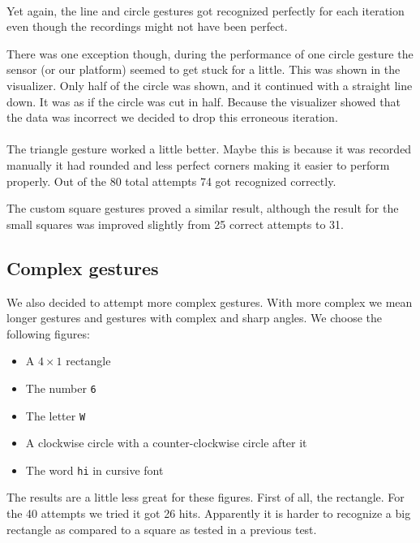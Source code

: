 \documentclass[a4paper]{article}
\providecommand{\tightlist}{%
\setlength{\itemsep}{0pt}\setlength{\parskip}{0pt}}
\begin{document}
  \paragraph{}
  Yet again, the line and circle gestures got recognized perfectly for each
  iteration even though the recordings might not have been perfect.

  There was one exception though, during the performance of one circle gesture
  the sensor (or our platform) seemed to get stuck for a little. This was shown
  in the visualizer. Only half of the circle was shown, and it continued with a
  straight line down. It was as if the circle was cut in half. Because the
  visualizer showed that the data was incorrect we decided to drop this erroneous
  iteration.

  \paragraph{}
  The triangle gesture worked a little better. Maybe this is because it was
  recorded manually it had rounded and less perfect corners making it easier to
  perform properly. Out of the 80 total attempts 74 got recognized correctly.

  The custom square gestures proved a similar result, although the result for
  the small squares was improved slightly from 25 correct attempts to 31.

  \subsection*{Complex gestures}
  We also decided to attempt more complex gestures. With more complex we mean
  longer gestures and gestures with complex and sharp angles. We choose the
  following figures:

  \begin{itemize}
    \tightlist{}
    \item A $4\times1$ rectangle
    \item The number \verb_6_
    \item The letter \verb_W_
    \item A clockwise circle with a counter-clockwise circle after it
    \item The word \verb_hi_ in cursive font
  \end{itemize}

  The results are a little less great for these figures. First of all, the
  rectangle. For the 40 attempts we tried it got 26 hits. Apparently it is
  harder to recognize a big rectangle as compared to a square as tested in a
  previous test.
\end{document}
